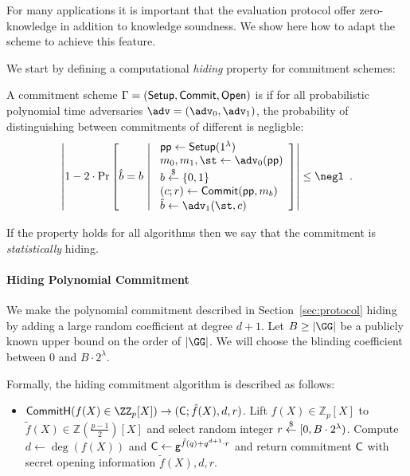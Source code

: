 For many applications it is important that the evaluation protocol offer zero-knowledge in addition to knowledge soundness. We show here how to adapt the scheme to achieve this feature.

We start by defining a computational \emph{hiding} property for commitment schemes:

\begin{definition}
A commitment scheme $\Gamma = (\textsf{{Setup}}, \textsf{{Commit}}, \textsf{{Open}})$ is  if for all probabilistic polynomial time adversaries $\adv = (\adv_0, \adv_1)$, the probability of distinguishing between commitments of different is negligble:
\[
	\left| 1 - 2 \cdot \mathrm{Pr}\left[
		\hat{b} = b \ \middle| \ 
		\begin{array}{l}
			\params \gets \pro{Setup}(1^\lambda) \\
			m_0, m_1, \st \gets \adv_0(\params) \\
			b \sample \{0,1\} \\
			(c; r) \gets \pro{Commit}(\params, m_b) \\
			\hat{b} \gets \adv_1(\st, c)
		\end{array}
	\right] \right| \leq \negl \enspace .
\]
\end{definition}
If the property holds for all algorithms then we say that the commitment is \emph{statistically} hiding.
\paragraph{Hiding Polynomial Commitment}
We make the polynomial commitment described in Section~\ref{sec:protocol} hiding by adding a large random coefficient at degree $d+1$. Let $B\geq |\GG|$ be a publicly known upper bound on the order of $|\GG|$. We will choose the blinding coefficient between $0$ and $B\cdot 2^\lambda$. 

Formally, the hiding commitment algorithm is described as follows:
\begin{itemize}
	\item $\pro{CommitH}(f(X) \in \ZZ_p[X]) \rightarrow (\gr{C}; \hat{f}(X), d, r)$. Lift $f(X) \in \mathbb{Z}_p[X]$ to $\tilde{f}(X) \in \mathbb{Z}(\frac{p-1}{2})[X]$ and select random integer $r \overset{\$}{\gets} [0,B\cdot 2^\lambda)$. Compute $d \gets \deg(f(X))$ and $\mathsf{C} \gets \mathsf{g}^{\tilde{f}(q)+q^{d+1} \cdot r}$ and return commitment $\mathsf{C}$ with secret opening information $\tilde{f}(X), d, r$.
\end{itemize}

